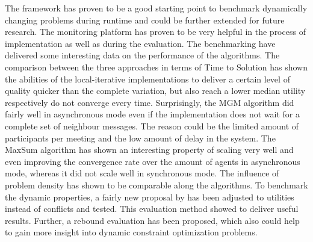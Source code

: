 The framework has proven to be a good starting point to benchmark dynamically changing problems during runtime and could be further extended for future research. The monitoring platform has proven to be very helpful in the process of implementation as well as during the evaluation. The benchmarking have delivered some interesting data on the performance of the algorithms. The comparison between the three approaches in terms of Time to Solution has shown the abilities of the local-iterative implementations to deliver a certain level of quality quicker than the complete variation, but also reach a lower median utility respectively do not converge every time. Surprisingly, the MGM algorithm did fairly well in asynchronous mode even if the implementation does not wait for a complete set of neighbour messages. The reason could be the limited amount of participants per meeting and the low amount of delay in the system. The MaxSum algorithm has shown an interesting property of scaling very well and even improving the convergence rate over the amount of agents in asynchronous mode, whereas it did not scale well in synchronous mode. The influence of problem density has shown to be comparable along the algorithms. To benchmark the dynamic properties, a fairly new proposal by \cite{Maillera} has been adjusted to utilities instead of conflicts and tested. This evaluation method showed to deliver useful results. Further, a rebound evaluation has been proposed, which also could help to gain more insight into dynamic constraint optimization problems.

